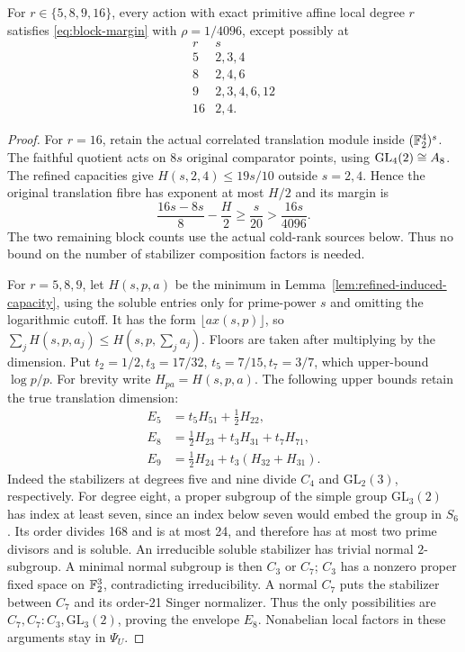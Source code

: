 \begin{theorem}
\label{thm:small-affine-capacity}
For $r\in\{5,8,9,16\}$, every action with exact primitive affine
local degree $r$ satisfies \eqref{eq:block-margin} with
$\rho=1/4096$, except possibly at
\[
 \begin{array}{c|l}r&s\\\hline
 5&2,3,4\\8&2,4,6\\9&2,3,4,6,12\\16&2,4.
 \end{array}
\]
\end{theorem}
\begin{proof}
For $r=16$, retain the actual correlated translation module inside
$(\mathbb F_2^4)^s$. The faithful quotient acts on $8s$ original comparator
points, using $\operatorname{GL}_4(2)\cong A_8$. The refined capacities give
$H(s,2,4)\leq19s/10$ outside $s=2,4$. Hence the original translation
fibre has exponent at most $H/2$ and its margin is
\[
 \frac{16s-8s}{8}-\frac H2\geq\frac{s}{20}
     >\frac{16s}{4096}.
\]
The two remaining block counts use the actual cold-rank sources below.
Thus no bound on the number of stabilizer composition factors is needed.

For $r=5,8,9$, let $H(s,p,a)$ be the minimum in Lemma~\ref{lem:refined-induced-capacity},
using the soluble entries only for prime-power $s$ and omitting the
logarithmic cutoff. It has the form $\lfloor ax(s,p)\rfloor$,
so $\sum_jH(s,p,a_j)\leq H(s,p,\sum_ja_j)$. Floors are taken
after multiplying by the dimension. Put $t_2=1/2,t_3=17/32$,
$t_5=7/15,t_7=3/7$, which upper-bound $\log p/p$.
For brevity write $H_{pa}=H(s,p,a)$. The following upper bounds
retain the true translation dimension:
\begin{align*}
 E_5&=t_5H_{51}+\tfrac12H_{22},\\
 E_8&=\tfrac12H_{23}+t_3H_{31}+t_7H_{71},\\
 E_9&=\tfrac12H_{24}+t_3(H_{32}+H_{31}).
\end{align*}
Indeed the stabilizers at degrees five and nine divide $C_4$ and
$\mathrm{GL}_2(3)$, respectively.
For degree eight, a proper subgroup of the simple group
$\mathrm{GL}_3(2)$ has index at least seven, since an index below
seven would embed the group in $S_6$. Its order divides 168 and is
at most 24, and therefore has at most two prime divisors and is
soluble. An irreducible soluble stabilizer has trivial normal
$2$-subgroup. A minimal normal subgroup is then $C_3$ or $C_7$;
$C_3$ has a nonzero proper fixed space on $\mathbb F_2^3$, contradicting
irreducibility. A normal $C_7$ puts the stabilizer between $C_7$
and its order-21 Singer normalizer. Thus the only possibilities are
$C_7,C_7:C_3,\mathrm{GL}_3(2)$, proving the envelope $E_8$.
Nonabelian local factors in these arguments stay in $\Psi_U$.


\end{proof}
